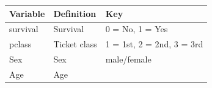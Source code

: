 \documentclass[11pt]{article}
\begin{document}
\begin{longtable}[]{@{}lll@{}}
\toprule
\begin{minipage}[b]{0.18\columnwidth}\raggedright\strut
Variable\strut
\end{minipage} & \begin{minipage}[b]{0.18\columnwidth}\raggedright\strut
Definition\strut
\end{minipage} & \begin{minipage}[b]{0.18\columnwidth}\raggedright\strut
Key\strut
\end{minipage}\tabularnewline
\midrule
\endhead
\begin{minipage}[t]{0.18\columnwidth}\raggedright\strut
survival\strut
\end{minipage} & \begin{minipage}[t]{0.18\columnwidth}\raggedright\strut
Survival\strut
\end{minipage} & \begin{minipage}[t]{0.18\columnwidth}\raggedright\strut
0 = No, 1 = Yes\strut
\end{minipage}\tabularnewline
\begin{minipage}[t]{0.18\columnwidth}\raggedright\strut
pclass\strut
\end{minipage} & \begin{minipage}[t]{0.18\columnwidth}\raggedright\strut
Ticket class\strut
\end{minipage} & \begin{minipage}[t]{0.18\columnwidth}\raggedright\strut
1 = 1st, 2 = 2nd, 3 = 3rd\strut
\end{minipage}\tabularnewline
\begin{minipage}[t]{0.18\columnwidth}\raggedright\strut
Sex\strut
\end{minipage} & \begin{minipage}[t]{0.18\columnwidth}\raggedright\strut
Sex\strut
\end{minipage} & \begin{minipage}[t]{0.18\columnwidth}\raggedright\strut
male/female\strut
\end{minipage}\tabularnewline
\begin{minipage}[t]{0.18\columnwidth}\raggedright\strut
Age\strut
\end{minipage} & \begin{minipage}[t]{0.18\columnwidth}\raggedright\strut
Age\strut
\end{minipage} & \begin{minipage}[t]{0.18\columnwidth}\raggedright\strut

\end{minipage}
\end{longtable}
\end{document}

